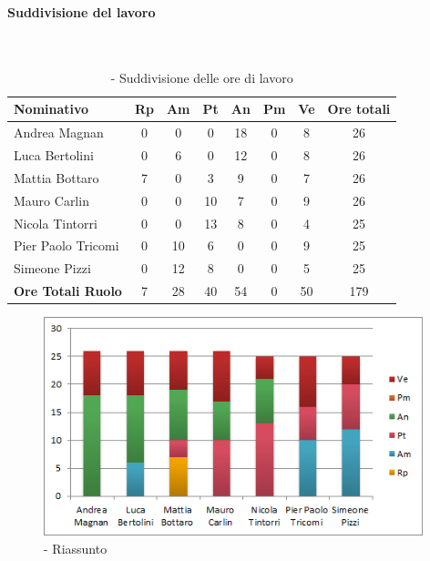 \documentclass[./PianoDiProgetto.tex]{subfiles}
\begin{document}
	\subsubsection{\PerPA}
				\paragraph{Suddivisione del lavoro}\

	\begin{table}[H]
		\centering

		\begin{tabularx}{\textwidth}{l  * {6}{c}  c}
			\toprule
			\textbf{Nominativo} & \textbf{Rp} & \textbf{Am} & \textbf{Pt}
						& \textbf{An} & \textbf{Pm} & \textbf{Ve} & \textbf{Ore totali} \\
			\midrule
			Andrea Magnan  & 0 & 0 & 0 & 18 & 0 & 8 & 26 \\
			Luca Bertolini  & 0 & 6 & 0 & 12 & 0 & 8 & 26 \\
			Mattia Bottaro  & 7 & 0 & 3 & 9 & 0 & 7 & 26 \\
			Mauro Carlin  & 0 & 0 & 10 & 7 & 0 & 9 & 26 \\
			Nicola Tintorri  & 0 & 0 & 13 & 8 & 0 & 4 & 25 \\
			Pier Paolo Tricomi  & 0 & 10 & 6 & 0 & 0 & 9 & 25 \\
			Simeone Pizzi & 0 & 12 & 8 & 0 & 0 & 5 & 25 \\
			\midrule
			\textbf{Ore Totali Ruolo} & 7 & 28 & 40 & 54 & 0 & 50 & 179 \\
			\bottomrule
		\end{tabularx}
		\caption{\PerPA{} - Suddivisione delle ore di lavoro}
	\end{table}
\vfill

	\begin{figure}[H]
		\centering
		\includegraphics[width=11cm, trim=1cm 0cm 1cm 0cm]{grafici/Pa-persona}
			\caption{\PerPA{} - Riassunto}
	\end{figure}
\vfill
\newpage
\end{document}
